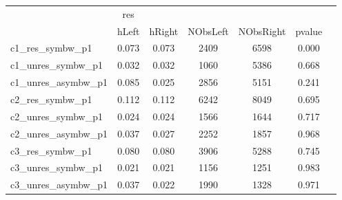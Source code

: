 \begin{tabular}{l*{6}{c}}
\toprule
&res&&&&\\
&hLeft&hRight&NObsLeft&NObsRight&pvalue\\
c1_res_symbw_p1&0.073&0.073&2409&6598&0.000\\
c1_unres_symbw_p1&0.032&0.032&1060&5386&0.668\\
c1_unres_asymbw_p1&0.085&0.025&2856&5151&0.241\\
c2_res_symbw_p1&0.112&0.112&6242&8049&0.695\\
c2_unres_symbw_p1&0.024&0.024&1566&1644&0.717\\
c2_unres_asymbw_p1&0.037&0.027&2252&1857&0.968\\
c3_res_symbw_p1&0.080&0.080&3906&5288&0.745\\
c3_unres_symbw_p1&0.021&0.021&1156&1251&0.983\\
c3_unres_asymbw_p1&0.037&0.022&1990&1328&0.971\\
\bottomrule
\end{tabular}
